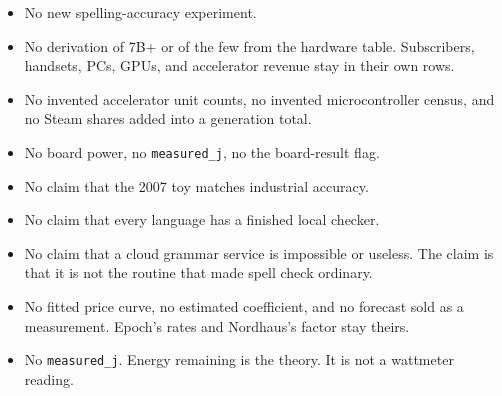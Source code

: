 \documentclass[
  10pt,
]{article}
\providecommand{\tightlist}{%
  \setlength{\itemsep}{0pt}\setlength{\parskip}{0pt}}
\begin{document}
\begin{itemize}
\tightlist
\item
  No new spelling-accuracy experiment.
\item
  No derivation of 7B+ or of the few from the hardware table.
  Subscribers, handsets, PCs, GPUs, and accelerator revenue stay in
  their own rows.
\item
  No invented accelerator unit counts, no invented microcontroller
  census, and no Steam shares added into a generation total.
\item
  No board power, no \texttt{measured\_j}, no the board-result flag.
\item
  No claim that the 2007 toy matches industrial accuracy.
\item
  No claim that every language has a finished local checker.
\item
  No claim that a cloud grammar service is impossible or useless. The
  claim is that it is not the routine that made spell check ordinary.
\item
  No fitted price curve, no estimated coefficient, and no forecast sold
  as a measurement. Epoch's rates and Nordhaus's factor stay theirs.
\item
  No \texttt{measured\_j}. Energy remaining is the theory. It is not a
  wattmeter reading.
\end{itemize}
\end{document}
